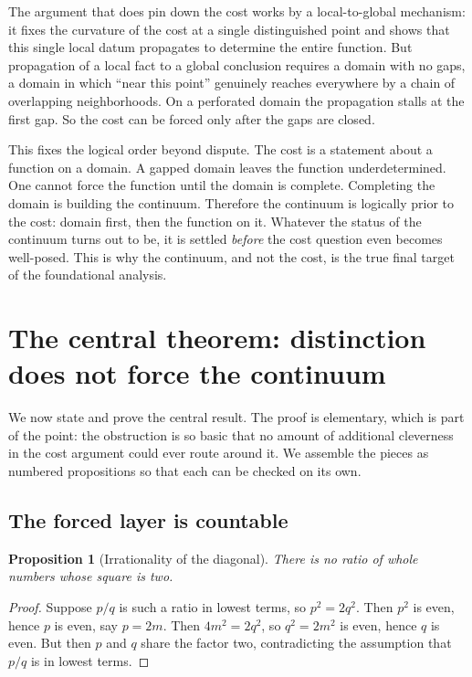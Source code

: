 \documentclass[11pt,a4paper]{article}
\newtheorem{proposition}[theorem]{Proposition}
\theoremstyle{definition}
\theoremstyle{remark}
\begin{document}
The argument that does pin down the cost works by a local-to-global mechanism: it
fixes the curvature of the cost at a single distinguished point and shows that
this single local datum propagates to determine the entire function. But
propagation of a local fact to a global conclusion requires a domain with no
gaps, a domain in which ``near this point'' genuinely reaches everywhere by a
chain of overlapping neighborhoods. On a perforated domain the propagation
stalls at the first gap. So the cost can be forced only after the gaps are
closed.

This fixes the logical order beyond dispute. The cost is a statement about a
function on a domain. A gapped domain leaves the function underdetermined. One
cannot force the function until the domain is complete. Completing the domain is
building the continuum. Therefore the continuum is logically prior to the cost:
domain first, then the function on it. Whatever the status of the continuum turns
out to be, it is settled \emph{before} the cost question even becomes well-posed.
This is why the continuum, and not the cost, is the true final target of the
foundational analysis.

\section{The central theorem: distinction does not force the continuum}\label{sec:central}

We now state and prove the central result. The proof is elementary, which is
part of the point: the obstruction is so basic that no amount of additional
cleverness in the cost argument could ever route around it. We assemble the
pieces as numbered propositions so that each can be checked on its own.

\subsection{The forced layer is countable}

\begin{proposition}[Irrationality of the diagonal]\label{prop:sqrt2}
There is no ratio of whole numbers whose square is two.
\end{proposition}

\begin{proof}
Suppose $p/q$ is such a ratio in lowest terms, so $p^2 = 2q^2$. Then $p^2$ is
even, hence $p$ is even, say $p = 2m$. Then $4m^2 = 2q^2$, so $q^2 = 2m^2$ is
even, hence $q$ is even. But then $p$ and $q$ share the factor two, contradicting
the assumption that $p/q$ is in lowest terms.
\end{proof}
\end{document}
